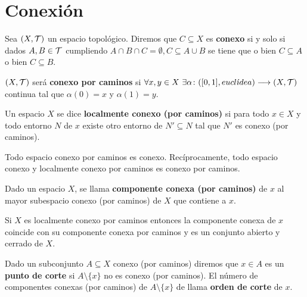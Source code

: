 \documentclass[GTS.tex]{subfiles}
\begin{document}
\section{Conexión}
\begin{defi} Sea $(X,\mathcal{T})$ un espacio topológico. Diremos que $C\subseteq X$ es \textbf{conexo} si y solo si dados $A,B\in\mathcal{T}$ cumpliendo $A\cap B\cap C=\emptyset, C\subseteq A\cup B$ se tiene que o bien $C\subseteq A$ o bien $C\subseteq B$.
\end{defi}
\begin{defi} $(X,\mathcal{T})$ será \textbf{conexo por caminos} si $\forall x,y\in X\ \exists\alpha\func{([0,1],eucl\acute{\imath}dea)}{(X,\Tau)}$ continua tal que $\alpha(0)=x$ y $\alpha(1)=y$.
\end{defi}

\begin{defi}
Un espacio $X$ se dice \textbf{localmente conexo (por caminos)} si para todo $x\in X$ y todo entorno $N$ de $x$ existe otro entorno de $N'\subseteq N$ tal que $N'$ es conexo (por caminos).
\end{defi}
\begin{prop} Todo espacio conexo por caminos es conexo. Recíprocamente, todo espacio conexo y localmente conexo por caminos es conexo por caminos.
\end{prop}

\begin{defi}
Dado un espacio $X$, se llama \textbf{componente conexa (por caminos)} de $x$ al mayor subespacio conexo (por caminos) de $X$ que contiene a $x$.
\end{defi}

\begin{prop}
Si $X$ es localmente conexo por caminos entonces la componente conexa de $x$ coincide con su componente conexa por caminos y es un conjunto abierto y cerrado de $X$.
\end{prop}

\begin{defi}Dado un subconjunto $A\subseteq X$ conexo (por caminos) diremos que $x\in A$ es un \textbf{punto de corte} si $A\setminus\{x\}$ no es conexo (por caminos). El número de componentes conexas (por caminos) de   $A\setminus\{x\}$ de llama \textbf{orden de corte} de $x$.
\end{defi}
\end{document}
